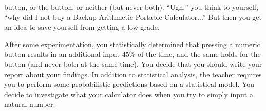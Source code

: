  button, or the %
 button, or neither (but never both).
``Ugh,'' you think to yourself, ``why did I not buy a Backup Arithmetic Portable Calculator...''
But then you get an idea to save yourself from getting a low grade.

After some experimentation, you statistically determined that pressing a numeric button results in an additional %
 input $45\%$ of the time, and the same holds for the %
 button
(and never both at the same time).
You decide that you should write your report about your findings.
In addition to statistical analysis, the teacher requires you to perform some probabilistic predictions based on a statistical model.
You decide to investigate what your calculator does when you try to simply input a natural number.

